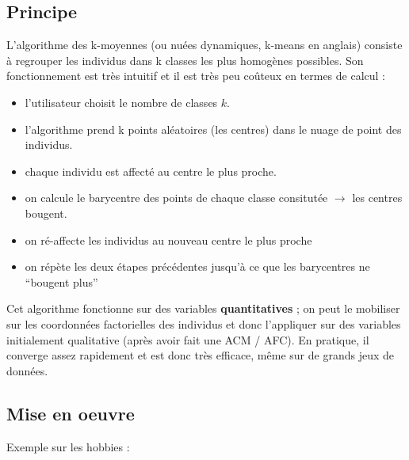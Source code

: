 \documentclass[]{book}
\newenvironment{Shaded}{\begin{snugshade}}{\end{snugshade}}
\newcommand{\DataTypeTok}[1]{\textcolor[rgb]{0.13,0.29,0.53}{#1}}
\newcommand{\DecValTok}[1]{\textcolor[rgb]{0.00,0.00,0.81}{#1}}
\newcommand{\KeywordTok}[1]{\textcolor[rgb]{0.13,0.29,0.53}{\textbf{#1}}}
\newcommand{\NormalTok}[1]{#1}
\newcommand{\OperatorTok}[1]{\textcolor[rgb]{0.81,0.36,0.00}{\textbf{#1}}}
\newcommand{\StringTok}[1]{\textcolor[rgb]{0.31,0.60,0.02}{#1}}
\providecommand{\tightlist}{%
  \setlength{\itemsep}{0pt}\setlength{\parskip}{0pt}}
\begin{document}
\hypertarget{principe}{%
\subsection{Principe}\label{principe}}

L'algorithme des k-moyennes (ou nuées dynamiques, k-means en anglais) consiste à regrouper les individus dans k classes les plus homogènes possibles. Son fonctionnement est très intuitif et il est très peu coûteux en termes de calcul :

\begin{itemize}
\tightlist
\item
  l'utilisateur choisit le nombre de classes \(k\).
\item
  l'algorithme prend k points aléatoires (les centres) dans le nuage de point des individus.
\item
  chaque individu est affecté au centre le plus proche.
\item
  on calcule le barycentre des points de chaque classe consitutée \(\rightarrow\) les centres bougent.
\item
  on ré-affecte les individus au nouveau centre le plus proche
\item
  on répète les deux étapes précédentes jusqu'à ce que les barycentres ne ``bougent plus''
\end{itemize}

Cet algorithme fonctionne sur des variables \textbf{quantitatives} ; on peut le mobiliser sur les coordonnées factorielles des individus et donc l'appliquer sur des variables initialement qualitative (après avoir fait une ACM / AFC). En pratique, il converge assez rapidement et est donc très efficace, même sur de grands jeux de données.

\hypertarget{mise-en-oeuvre}{%
\subsection{Mise en oeuvre}\label{mise-en-oeuvre}}

Exemple sur les hobbies :

\begin{Shaded}
\end{Shaded}
\end{document}
